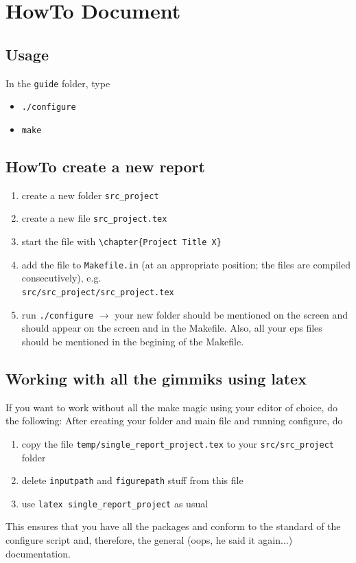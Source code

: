 \chapter{HowTo Document \ccarat{}} 

\newcommand{\test}[1]{\vec{#1}}

\section{Usage}

In the \verb|guide| folder, type
\begin{itemize}
\item \verb|./configure|
\item \verb|make|
\end{itemize}


\section{HowTo create a new report}

\begin{enumerate}
  \item create a new folder \verb|src_project|
  \item create a new file \verb|src_project.tex|
  \item start the file with \verb|\chapter{Project Title X}|
  \item add the file to \texttt{Makefile.in} (at an appropriate position; the
  files are compiled consecutively), e.g.\\
  \verb|src/src_project/src_project.tex|
  \item run \verb|./configure| $\to$ your new folder should be mentioned on the screen and should appear on the screen and in the Makefile. Also, all your eps files should be mentioned in the begining of the Makefile.
\end{enumerate}


\section{Working with all the gimmiks using latex}
If you want to work without all the make magic using your editor of choice, do the following:
After creating your folder and main file and running configure, do
\begin{enumerate}
 \item copy the file \verb|temp/single_report_project.tex| to your \verb|src/src_project| folder
 \item delete \verb|inputpath| and \verb|figurepath| stuff from this file
 \item use \verb|latex single_report_project| as usual
\end{enumerate}
This ensures that you have all the packages and conform to the standard of the configure script and, therefore, the general \ccarat{} (oops, he said it again...) documentation.


